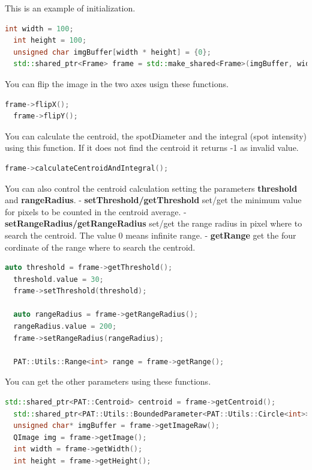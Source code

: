 This is an example of initialization.

\begin{lstlisting}[language=c++, gobble=2, caption=Frame initialization example.]
  int width = 100;
  int height = 100;
  unsigned char imgBuffer[width * height] = {0};
  std::shared_ptr<Frame> frame = std::make_shared<Frame>(imgBuffer, width, height, QImage::Format_Grayscale8);
\end{lstlisting}

You can flip the image in the two axes usign these functions.

\begin{lstlisting}[language=c++, gobble=2]
  frame->flipX();
  frame->flipY();
\end{lstlisting}

You can calculate the centroid, the spotDiameter and the integral (spot
intensity) using this function. If it does not find the centroid it
returns -1 as invalid value.

\begin{lstlisting}[language=c++, gobble=2]
  frame->calculateCentroidAndIntegral();
\end{lstlisting}

You can also control the centroid calculation setting the parameters
\textbf{threshold} and \textbf{rangeRadius}. -
\textbf{setThreshold/getThreshold} set/get the minimum value for pixels
to be counted in the centroid average. -
\textbf{setRangeRadius/getRangeRadius} set/get the range radius in pixel
where to search the centroid. The value 0 means infinite range. -
\textbf{getRange} get the four cordinate of the range where to search
the centroid.

\begin{lstlisting}[language=c++, gobble=2]
  auto threshold = frame->getThreshold();
  threshold.value = 30;
  frame->setThreshold(threshold);
  
  auto rangeRadius = frame->getRangeRadius();
  rangeRadius.value = 200;
  frame->setRangeRadius(rangeRadius);
  
  PAT::Utils::Range<int> range = frame->getRange();
\end{lstlisting}

You can get the other parameters using these functions.

\begin{lstlisting}[language=c++, gobble=2]
  std::shared_ptr<PAT::Centroid> centroid = frame->getCentroid();
  std::shared_ptr<PAT::Utils::BoundedParameter<PAT::Utils::Circle<int>>> target = frame->getTarget();
  unsigned char* imgBuffer = frame->getImageRaw();
  QImage img = frame->getImage();
  int width = frame->getWidth();
  int height = frame->getHeight();
\end{lstlisting}

